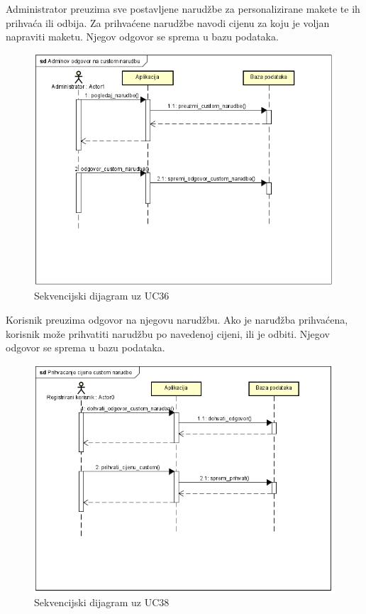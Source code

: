 				Administrator preuzima sve postavljene narudžbe za personalizirane makete te ih prihvaća ili odbija. Za prihvaćene narudžbe navodi cijenu za koju je voljan napraviti maketu. Njegov odgovor se sprema u bazu podataka. 
				
				\begin{figure} [!h]
					\centering
					\includegraphics[scale=0.65]{"slike/seqdiag_02"}
					\caption{Sekvencijski dijagram uz UC36}
					\label{fig:seqdiag_02}
				\end{figure}
				\pagebreak
				
				Korisnik preuzima odgovor na njegovu narudžbu. Ako je naruđžba prihvaćena, korisnik može prihvatiti narudžbu po navedenoj cijeni, ili je odbiti. Njegov odgovor se sprema u bazu podataka.
				
				\begin{figure} [!h]
					\centering
					\includegraphics[scale=0.65]{"slike/seqdiag_03"}
					\caption{Sekvencijski dijagram uz UC38}
					\label{fig:seqdiag_03}
				\end{figure}
				\pagebreak
				
